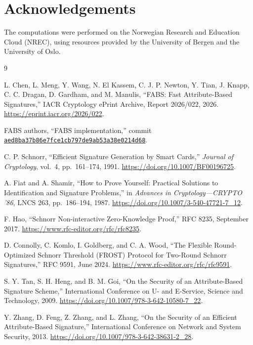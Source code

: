\documentclass[10pt,a4paper]{article}
\begin{document}
\section*{Acknowledgements}

The computations were performed on the Norwegian Research and Education Cloud (NREC), using resources provided by the University of Bergen and the University of Oslo.

\begin{thebibliography}{9}

L. Chen, L. Meng, Y. Wang, N. El Kassem, C. J. P. Newton, Y. Tian,
J. Knapp, C. C. Dragan, D. Gardham, and M. Manulis,
``FABS: Fast Attribute-Based Signatures,'' IACR Cryptology ePrint Archive,
Report 2026/022, 2026.
\url{https://eprint.iacr.org/2026/022}.

FABS authors,
``FABS implementation,'' commit
\href{https://github.com/Anonymous-Mystery/FABS/commit/aed8ba37b86e7fce1cb797de9ab53a38e0214d68}{\texttt{aed8ba37b86e7fce1cb797de9ab53a38e0214d68}}.

C. P. Schnorr,
``Efficient Signature Generation by Smart Cards,''
\emph{Journal of Cryptology}, vol.~4, pp.~161--174, 1991.
\url{https://doi.org/10.1007/BF00196725}.

A. Fiat and A. Shamir,
``How to Prove Yourself: Practical Solutions to Identification and Signature
Problems,'' in \emph{Advances in Cryptology---CRYPTO '86}, LNCS 263,
pp.~186--194, 1987.
\url{https://doi.org/10.1007/3-540-47721-7_12}.

F. Hao,
``Schnorr Non-interactive Zero-Knowledge Proof,'' RFC 8235, September 2017.
\url{https://www.rfc-editor.org/rfc/rfc8235}.

D. Connolly, C. Komlo, I. Goldberg, and C. A. Wood,
``The Flexible Round-Optimized Schnorr Threshold (FROST) Protocol for
Two-Round Schnorr Signatures,'' RFC 9591, June 2024.
\url{https://www.rfc-editor.org/rfc/rfc9591}.

S. Y. Tan, S. H. Heng, and B. M. Goi,
``On the Security of an Attribute-Based Signature Scheme,''
International Conference on U- and E-Service, Science and Technology, 2009.
\url{https://doi.org/10.1007/978-3-642-10580-7_22}.

Y. Zhang, D. Feng, Z. Zhang, and L. Zhang,
``On the Security of an Efficient Attribute-Based Signature,''
International Conference on Network and System Security, 2013.
\url{https://doi.org/10.1007/978-3-642-38631-2_28}.

\end{thebibliography}
\end{document}
